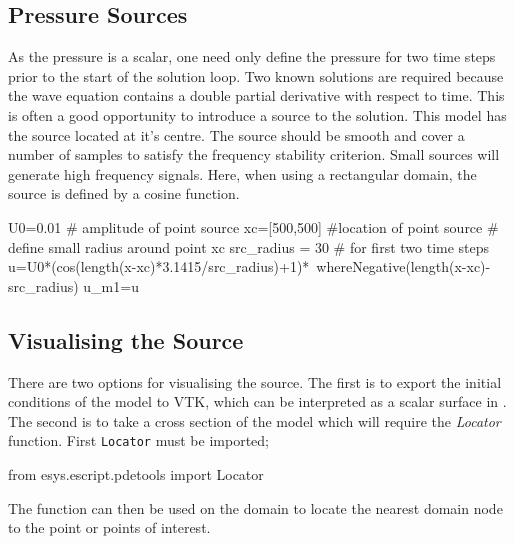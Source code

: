 \subsection{Pressure Sources}
As the pressure is a scalar, one need only define the pressure for two 
time steps prior to the start of the solution loop. Two known solutions are
required because the wave equation contains a double partial derivative with
respect to time. This is often a good opportunity to introduce a source to the
solution. This model has the source located at it's centre. The source should
be smooth and cover a number of samples to satisfy the frequency stability
criterion. Small sources will generate high frequency signals. Here, when using
a rectangular domain, the source is defined by a cosine function.
\begin{python}
U0=0.01 # amplitude of point source
xc=[500,500] #location of point source
# define small radius around point xc
src_radius = 30
# for first two time steps
u=U0*(cos(length(x-xc)*3.1415/src_radius)+1)*\
	whereNegative(length(x-xc)-src_radius)
u_m1=u
\end{python}

\subsection{Visualising the Source}
There are two options for visualising the source. The first is to export the
initial conditions of the model to VTK, which can be interpreted as a scalar
surface in \mayavi. The second is to take a cross section of the model which
will require the \textit{Locator} function. 
First \verb!Locator! must be imported;
\begin{python}
 from esys.escript.pdetools import Locator
\end{python}
The function can then be used on the domain to locate the nearest domain node
to the point or points of interest.

